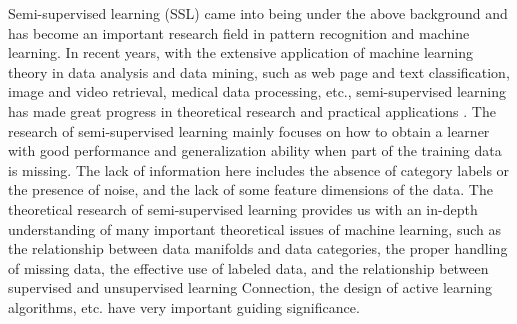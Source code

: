 \documentclass[11pt,en]{elegantpaper}
\begin{document}
Semi-supervised learning (SSL) came into being under the above background and has become an important research field in pattern recognition and machine learning. In recent years, with the extensive application of machine learning theory in data analysis and data mining, such as web page and text classification, image and video retrieval, medical data processing, etc., semi-supervised learning has made great progress in theoretical research and practical applications . The research of semi-supervised learning mainly focuses on how to obtain a learner with good performance and generalization ability when part of the training data is missing. The lack of information here includes the absence of category labels or the presence of noise, and the lack of some feature dimensions of the data. The theoretical research of semi-supervised learning provides us with an in-depth understanding of many important theoretical issues of machine learning, such as the relationship between data manifolds and data categories, the proper handling of missing data, the effective use of labeled data, and the relationship between supervised and unsupervised learning Connection, the design of active learning algorithms, etc. have very important guiding significance.
\end{document}
